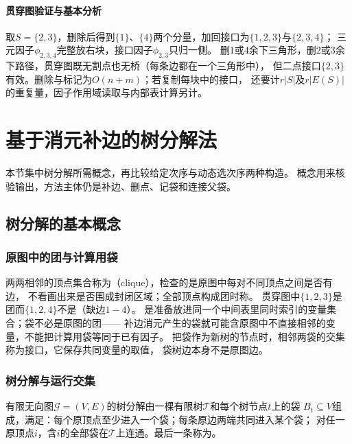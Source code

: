 \paragraph{贯穿图验证与基本分析}
取$S=\{2,3\}$，删除后得到$\{1\}$、$\{4\}$两个分量，加回接口为$\{1,2,3\}$与$\{2,3,4\}$；
三元因子$\phi_{2,3,4}$完整放右块，接口因子$\phi_{2,3}$只归一侧。
删$1$或$4$余下三角形，删$2$或$3$余下路径，贯穿图既无割点也无桥（每条边都在一个三角形中），
但二点接口$\{2,3\}$有效。删除与标记为$O(n+m)$；若复制每块中的接口，
还要计$r|S|$及$r|E(S)|$的重复量，因子作用域读取与内部表计算另计。

\section{基于消元补边的树分解法}
\label{sec:graph-theory-tree-decomposition}

本节集中树分解所需概念，再比较给定次序与动态选次序两种构造。
概念用来核验输出，方法主体仍是补边、删点、记袋和连接父袋。

\subsection{树分解的基本概念}

\subsubsection{原图中的团与计算用袋}
两两相邻的顶点集合称为（clique），检查的是原图中每对不同顶点之间是否有边，
不看画出来是否围成封闭区域；全部顶点构成团时称。
贯穿图中$\{1,2,3\}$是团而$\{1,2,4\}$不是（缺边$1-4$）。
是准备放进同一个中间表里同时索引的变量集合；袋不必是原图的团——
补边消元产生的袋就可能含原图中不直接相邻的变量，不能把计算用袋等同于已有因子。
把袋作为新树的节点时，相邻两袋的交集称为接口，它保存共同变量的取值，
袋树边本身不是原图边。

\subsubsection{树分解与运行交集}
\begin{definition}[树分解]
  \label{def:graph-theory-tree-decomposition}
  有限无向图$\mathcal G=(V,E)$的树分解由一棵有限树$\mathcal T$和每个树节点$t$上的袋
  $B_t\subseteq V$组成，满足：每个原顶点至少进入一个袋；每条原边两端共同进入某个袋；
  对任一原顶点$i$，含$i$的全部袋在$\mathcal T$上连通。最后一条称为。
\end{definition}

